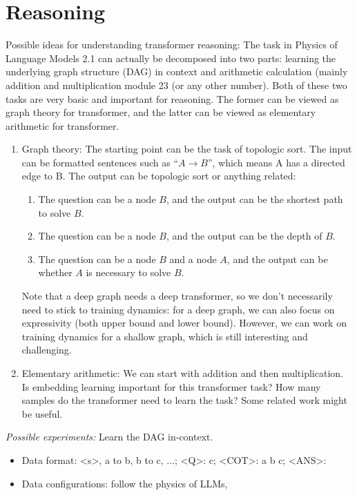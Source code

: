 \section{Reasoning}

Possible ideas for understanding transformer reasoning: The task in Physics of Language Models 2.1 \citep{ye2024physics} can actually be decomposed into two parts: learning the underlying graph structure (DAG) in context and arithmetic calculation (mainly addition and multiplication module 23 (or any other number). Both of these two tasks are very basic and important for reasoning. The former can be viewed as graph theory for transformer, and the latter can be viewed as elementary arithmetic for transformer.

\begin{enumerate}
    \item Graph theory: The starting point can be the task of topologic sort. The input can be formatted sentences such as ``$A \to B$'', which means A has a directed edge to B. The output can be topologic sort or anything related:
    \begin{enumerate}
        \item The question can be a node $B$, and the output can be the shortest path to solve $B$.
        \item The question can be a node $B$, and the output can be the depth of $B$.
        \item The question can be a node $B$ and a node $A$, and the output can be whether $A$ is necessary to solve $B$.
    \end{enumerate}
    Note that a deep graph needs a deep transformer, so we don't necessarily need to stick to training dynamics: for a deep graph, we can also focus on expressivity (both upper bound and lower bound). However, we can work on training dynamics for a shallow graph, which is still interesting and challenging. 

    
    \item Elementary arithmetic: We can start with addition and then multiplication. Is embedding learning important for this transformer task? How many samples do the transformer need to learn the task? Some related work \citep{zhong2024clock,tian2024composing} might be useful.
\end{enumerate}


\emph{Possible experiments:} Learn the DAG in-context. 
\begin{itemize}
    \item Data format: <s>, a to b, b to c, $\ldots$; <Q>: c; <COT>: a b c; <ANS>: 
    \item Data configurations: follow the physics of LLMs, 
\end{itemize}



